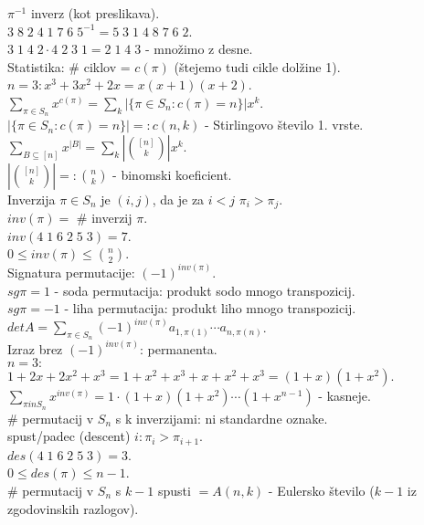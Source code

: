 \documentclass[a4paper, 12pt]{book}
\theoremstyle{definition}
\theoremstyle{remark}
\begin{document}
$\pi^{-1}$ inverz (kot preslikava). \\
$3 \; 8 \; 2 \; 4 \; 1 \; 7 \; 6 \; 5^{-1} = 5 \; 3 \; 1 \; 4 \; 8 \; 7 \; 6 \; 2$. \\
$3 \; 1 \; 4 \; 2 \cdot 4 \; 2 \; 3 \; 1 = 2 \; 1 \; 4 \; 3$ - množimo z desne. \\
Statistika: \# ciklov = $c(\pi)$ (štejemo tudi cikle dolžine 1). \\
$n=3: x^3 + 3 x^2 + 2 x = x(x+1)(x+2)$. \\
$\sum_{\pi \in S_n} x^{c(\pi)} = \sum_k |\{\pi \in S_n: c(\pi) = n\}| x^k$. \\
$|\{\pi \in S_n: c(\pi) = n\}| =: c(n,k)$ - Stirlingovo število 1. vrste. \\
$\sum_{B \subseteq [n]} x^{|B|} = \sum_k |\binom{[n]}{k}| x^k$. \\
$|\binom{[n]}{k}| =: \binom{n}{k}$ - binomski koeficient. \\
%
%
%
Inverzija $\pi \in S_n$ je $(i,j)$, da je za $i < j$ $\pi_i > \pi_j$. \\
$inv(\pi) = $ \# inverzij $\pi$. \\
$inv(4 \; 1 \; 6 \; 2 \; 5 \; 3) = 7$. \\
$0 \leq inv(\pi) \leq \binom{n}{2}$. \\
Signatura permutacije: $(-1)^{inv(\pi)}$. \\
$sg \pi = 1$ - soda permutacija: produkt sodo mnogo transpozicij. \\
$sg \pi = -1$ - liha permutacija: produkt liho mnogo transpozicij. \\
$det A = \sum_{\pi \in S_n} (-1)^{inv(\pi)} a_{1,\pi(1)} \cdots a_{n,\pi(n)}$. \\
Izraz brez $(-1)^{inv(\pi)}$: permanenta. \\
$n=3:$ \\
$1 + 2 x + 2 x^2 + x^3 = 1 + x^2 + x^3 + x + x^2 + x^3 = (1+x)(1+x^2)$. \\
$\sum_{\pi in S_n} x^{inv(\pi)} = 1 \cdot (1+x) (1+x^2) \cdots (1+x^{n-1})$ - kasneje. \\
\# permutacij v $S_n$ s k inverzijami: ni standardne oznake. \\
spust/padec (descent) $i: \pi_i > \pi_{i+1}$. \\
$des(4 \; 1 \; 6 \; 2 \; 5 \; 3) = 3$. \\
$0 \leq des(\pi) \leq n-1$. \\
\# permutacij v $S_n$ s $k-1$ spusti $= A(n,k)$ - Eulersko število ($k-1$ iz zgodovinskih razlogov). \\
\end{document}
